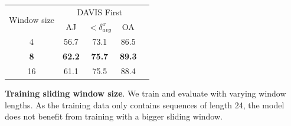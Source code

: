 
\begin{tabular}{ ccccc }
\toprule
 \multirow{2}{*}{Window size}  & \multicolumn{3}{c}{DAVIS First} \\
\cmidrule(lr){2-4}
            & AJ            & \! \! \! $< \delta^x_{avg}$\! & OA    \\
\midrule

4         &  56.7  & 73.1 &  86.5  \\
\textbf{8}         &  \textbf{62.2}          & \textbf{75.7}  & \textbf{89.3} \\
16 &  61.1 & 75.5 & 88.4 \\
\bottomrule
\end{tabular}
\caption{  \textbf{Training sliding window size}. We train and evaluate \method with varying window lengths. As the training data only contains sequences of length 24, the model does not benefit from training with a bigger sliding window.}\label{tab:tab_train_sliding_window_len_ablation}
